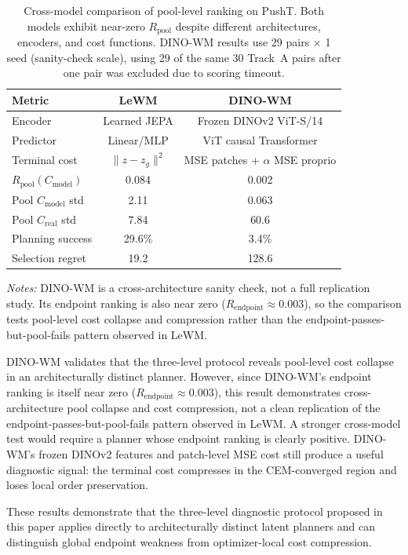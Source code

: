 \begin{table}[t]
\centering
\caption{Cross-model comparison of pool-level ranking on PushT. Both models exhibit near-zero $R_{\text{pool}}$ despite different architectures, encoders, and cost functions. DINO-WM results use 29 pairs $\times$ 1 seed (sanity-check scale), using 29 of the same 30 Track~A pairs after one pair was excluded due to scoring timeout.}
\label{tab:cross_model}
\begin{tabular}{lcc}
\toprule
Metric & LeWM & DINO-WM \\
\midrule
Encoder & Learned JEPA & Frozen DINOv2 ViT-S/14 \\
Predictor & Linear/MLP & ViT causal Transformer \\
Terminal cost & $\|z - z_g\|^2$ & MSE patches + $\alpha$ MSE proprio \\
$R_{\text{pool}}(C_{\text{model}})$ & 0.084 & 0.002 \\
Pool $C_{\text{model}}$ std & 2.11 & 0.063 \\
Pool $C_{\text{real}}$ std & 7.84 & 60.6 \\
Planning success & 29.6\% & 3.4\% \\
Selection regret & 19.2 & 128.6 \\
\bottomrule
\end{tabular}
\smallskip
\begin{minipage}{0.98\linewidth}
\scriptsize
\textit{Notes:} DINO-WM is a cross-architecture sanity check, not a full replication study. Its endpoint ranking is also near zero ($R_{\text{endpoint}} \approx 0.003$), so the comparison tests pool-level cost collapse and compression rather than the endpoint-passes-but-pool-fails pattern observed in LeWM.
\end{minipage}
\end{table}

DINO-WM validates that the three-level protocol reveals pool-level cost collapse in an architecturally distinct planner. However, since DINO-WM's endpoint ranking is itself near zero ($R_{\text{endpoint}} \approx 0.003$), this result demonstrates cross-architecture pool collapse and cost compression, not a clean replication of the endpoint-passes-but-pool-fails pattern observed in LeWM. A stronger cross-model test would require a planner whose endpoint ranking is clearly positive. DINO-WM's frozen DINOv2 features and patch-level MSE cost still produce a useful diagnostic signal: the terminal cost compresses in the CEM-converged region and loses local order preservation.

These results demonstrate that the three-level diagnostic protocol proposed in this paper applies directly to architecturally distinct latent planners and can distinguish global endpoint weakness from optimizer-local cost compression.
